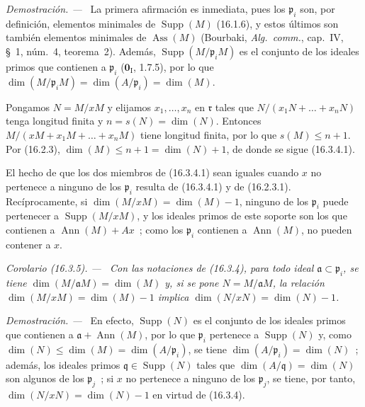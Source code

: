\documentclass[10pt,oneside]{book}
\makeatletter
\newcommand{\setmanualcurrentlabel}[1]{\def\@currentlabel{#1}}
\newcommand{\oldpage}[2][]{%
  \setcounter{footnote}{0}%
  \marginpar{\scriptsize\textbf{#1}~|~#2}\ignorespaces}
\newenvironment{corollary}[1][]{%
  \setmanualcurrentlabel{#1}\par\medskip\noindent\itshape Corolario (#1). ---\ }{\par}
\newenvironment{proof}{%
  \par\medskip\noindent\textit{Demostración. ---\ }}{\par}
\providecommand{\setmin}{-}%
\makeatother
\begin{document}
\begin{proof}
La primera afirmación es inmediata, pues los $\mathfrak{p}_i$ son, por
definición, elementos minimales de $\operatorname{Supp}(M)$ (16.1.6), y estos
últimos son también elementos minimales de $\operatorname{Ass}(M)$ (Bourbaki,
\emph{Alg.~comm.}, cap.~IV, \S~1, núm.~4, teorema~2). Además,
$\operatorname{Supp}(M/\mathfrak{p}_iM)$ es el conjunto de los ideales primos
que contienen a $\mathfrak{p}_i$ ($\mathbf{0}_{\mathrm I}$, 1.7.5), por lo que
$\dim(M/\mathfrak{p}_iM)=\dim(A/\mathfrak{p}_i)=\dim(M)$.

Pongamos $N=M/xM$ y elijamos $x_1,\ldots,x_n$ en $\mathfrak{r}$ tales
que $N/(x_1N+\ldots+x_nN)$ tenga longitud finita y $n=s(N)=\dim(N)$.
Entonces $M/(xM+x_1M+\ldots+x_nM)$ tiene longitud finita, por lo que $s(M)\leq n+1$.
Por (16.2.3), $\dim(M)\leq n+1=\dim(N)+1$, de donde se sigue (16.3.4.1).

El hecho de que los dos miembros de (16.3.4.1) sean iguales cuando $x$ no
pertenece a ninguno de los $\mathfrak{p}_i$ resulta de (16.3.4.1) y de
(16.2.3.1). Recíprocamente, si
\oldpage[0\textsubscript{IV-1}]{30}
$\dim(M/xM)=\dim(M)\setmin 1$, ninguno de los $\mathfrak{p}_i$ puede pertenecer a
$\operatorname{Supp}(M/xM)$, y los ideales primos de este soporte son los que
contienen a $\operatorname{Ann}(M)+Ax$~; como los $\mathfrak{p}_i$ contienen a
$\operatorname{Ann}(M)$, no pueden contener a $x$.
\end{proof}

\begin{corollary}[16.3.5]
\label{0.16.3.5-es}
Con las notaciones de \textup{(16.3.4)}, para todo ideal
$\mathfrak{a}\subset\mathfrak{p}_i$, se tiene
$\dim(M/\mathfrak{a}M)=\dim(M)$ y, si se pone
$N=M/\mathfrak{a}M$, la relación $\dim(M/xM)=\dim(M)\setmin 1$ implica
$\dim(N/xN)=\dim(N)\setmin 1$.
\end{corollary}

\begin{proof}
En efecto, $\operatorname{Supp}(N)$ es el conjunto de los ideales primos que
contienen a $\mathfrak{a}+\operatorname{Ann}(M)$, por lo que $\mathfrak{p}_i$
pertenece a $\operatorname{Supp}(N)$ y, como
$\dim(N)\leq\dim(M)=\dim(A/\mathfrak{p}_i)$, se tiene
$\dim(A/\mathfrak{p}_i)=\dim(N)$~; además, los ideales primos
$\mathfrak{q}\in\operatorname{Supp}(N)$ tales que
$\dim(A/\mathfrak{q})=\dim(N)$ son algunos de los $\mathfrak{p}_j$~; si $x$
no pertenece a ninguno de los $\mathfrak{p}_j$, se tiene, por tanto,
$\dim(N/xN)=\dim(N)\setmin 1$ en virtud de (16.3.4).
\end{proof}
\end{document}
